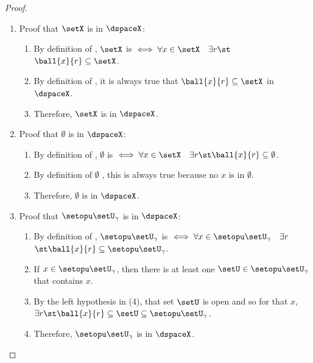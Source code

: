 \begin{proof}
\begin{enumerate}
  \item Proof that $\setX$ is  in $\dspaceX$:
    \begin{enumerate}
      \item By definition of  , 
            $\setX$ is  $\iff \forall x\in\setX \quad\exists r \st$\\$\ball{x}{r}\subseteq \setX$.
      \item By definition of  , it is always true that $\ball{x}{r}\subseteq\setX$ in $\dspaceX$.
      \item Therefore, $\setX$ is  in $\dspaceX$.
    \end{enumerate}

  \item Proof that $\emptyset$ is  in $\dspaceX$:
    \begin{enumerate}
      \item By definition of  , 
            $\emptyset$ is  $\iff \forall x\in\setX \quad\exists r \st \ball{x}{r}\subseteq \emptyset$.
      \item By definition of  $\emptyset$ , this is always true because no $x$ is in $\emptyset$.
      \item Therefore, $\emptyset$ is  in $\dspaceX$.
    \end{enumerate}

  \item Proof that $\setopu\setU_\gamma$ is  in $\dspaceX$:
    \begin{enumerate}
      \item By definition of  , 
            $\setopu\setU_\gamma$ is  $\iff \forall x\in\setopu\setU_\gamma \quad\exists r$\\$\st \ball{x}{r}\subseteq\setopu\setU_\gamma$.
      \item If $x\in\setopu\setU_\gamma$, then there is at least one $\setU\in\setopu\setU_\gamma$ that contains $x$.
      \item By the left hypothesis in (4), that set $\setU$ is open and so for that $x$,
            $\exists r \st \ball{x}{r}\subseteq\setU\subseteq\setopu\setU_\gamma$.
      \item Therefore, $\setopu\setU_\gamma$ is  in $\dspaceX$.
    \end{enumerate}


\end{enumerate}
\end{proof}
